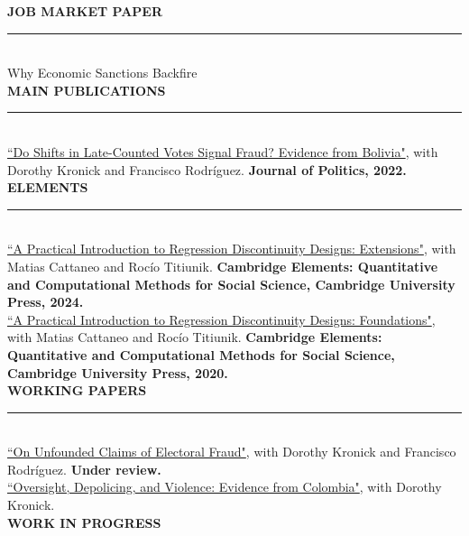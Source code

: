 \documentclass[10pt, english]{article}
\begin{document}
\vspace{0.2cm}
\textbf{JOB MARKET PAPER}

\noindent\rule{\textwidth}{1pt}\\

Why Economic Sanctions Backfire\\

\vspace{0.2cm}
\textbf{MAIN PUBLICATIONS}

\noindent\rule{\textwidth}{1pt}\\

\href{https://www.journals.uchicago.edu/doi/10.1086/719639}{``Do Shifts in Late-Counted Votes Signal Fraud? Evidence from Bolivia"}, with Dorothy Kronick and Francisco Rodr\'iguez. \textbf{Journal of Politics, 2022.}\\

\vspace{0.2cm}
\textbf{ELEMENTS}

\noindent\rule{\textwidth}{1pt}\\

\href{https://doi.org/10.1017/9781009441896}{``A Practical Introduction to Regression Discontinuity Designs: Extensions"}, with Matias Cattaneo and Roc\'io Titiunik. \textbf{Cambridge Elements: Quantitative and Computational Methods for Social Science, Cambridge University Press, 2024.}\\

\href{https://doi.org/10.1017/9781108684606}{``A Practical Introduction to Regression Discontinuity Designs: Foundations"}, with Matias Cattaneo and Roc\'io Titiunik. \textbf{Cambridge Elements: Quantitative and Computational Methods for Social Science, Cambridge University Press, 2020.}\\

\vspace{0.2cm}
\textbf{WORKING PAPERS}

\noindent\rule{\textwidth}{1pt}\\

\href{https://dorothykronick.com/Bolivia_WDResponse.pdf}{``On Unfounded Claims of Electoral Fraud"}, with Dorothy Kronick and Francisco Rodr\'iguez. \textbf{Under review.}\\

\href{https://dorothykronick.com/Ley906_202406.pdf}{``Oversight, Depolicing, and Violence: Evidence from Colombia"}, with Dorothy Kronick.\\

\newpage
\textbf{WORK IN PROGRESS}
\end{document}
